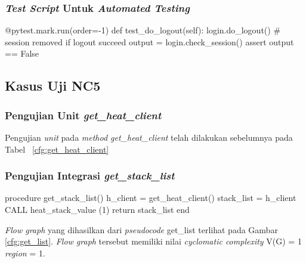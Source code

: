 \subsubsection{\emph{Test Script} Untuk \emph{Automated Testing}}

\begin{code}
\begin{ignasicblock}[title=test\_do\_logout,minted language=Python]
@pytest.mark.run(order=-1)
def test_do_logout(self):
    login.do_logout()
    # session removed if logout succeed
    output = login.check_session()
    assert output == False
\end{ignasicblock}
\label{ts:do_logout}
\end{code}


\subsection{Kasus Uji NC5}

\subsubsection{Pengujian Unit \emph{get\_heat\_client}}

\noindent
Pengujian \emph{unit} pada \emph{method get\_heat\_client} telah
dilakukan sebelumnya pada Tabel ~\ref{cfg:get_heat_client}

\subsubsection{Pengujian Integrasi \emph{get\_stack\_list}}

\begin{code}
\begin{ignasicblock}[title=get\_stack\_list,minted language=text]
procedure get_stack_list()
    h_client = get_heat_client()
    stack_list = h_client CALL heat_stack_value  (1)
    return stack_list
end
\end{ignasicblock}
\label{pc:get_list}
\end{code}

\par\null\par
\noindent
\emph{Flow graph} yang dihasilkan dari \emph{pseudocode}
get\_list terlihat pada Gambar \ref{cfg:get_list}. \emph{Flow graph} tersebut memiliki
nilai \emph{cyclomatic complexity} V(G) = 1 \emph{region} = 1.

